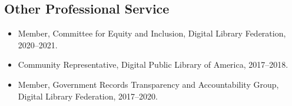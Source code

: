 \documentclass[10pt]{article}
\begin{document}
\subsection{Other Professional Service}

\begin{itemize}
  \item Member, Committee for Equity and Inclusion, Digital Library Federation, 2020--2021.
  
  \item Community Representative, Digital Public Library of America, 2017--2018.
  
  \item Member, Government Records Transparency and Accountability Group, Digital Library Federation, 2017--2020.
\end{itemize}
\end{document}
